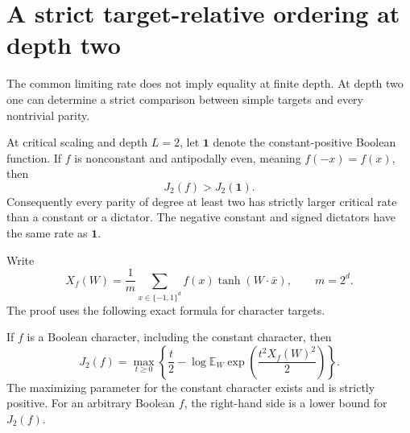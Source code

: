\section{A strict target-relative ordering at depth two}
\label{sec:critical-shallow-ordering}

The common limiting rate does not imply equality at finite depth.
At depth two one can determine a strict comparison between simple
targets and every nontrivial parity.

\begin{theorem}
\label{thm:critical-shallow-parity-ordering}
At critical scaling and depth $L=2$, let $\mathbf1$ denote the
constant-positive Boolean function. If $f$ is nonconstant and
antipodally even, meaning $f(-x)=f(x)$, then
\[
 J_2(f)>J_2(\mathbf1).
\]
Consequently every parity of degree at least two has strictly larger
critical rate than a constant or a dictator. The negative constant
and signed dictators have the same rate as $\mathbf1$.
\end{theorem}

Write
\[
 X_f(W)=\frac1m\sum_{x\in\{-1,1\}^d}
                 f(x)\tanh(W\cdot\bar x),\qquad m=2^d.
\]
The proof uses the following exact formula for character targets.

\begin{lemma}
\label{lem:critical-character-cramer}
If $f$ is a Boolean character, including the constant character, then
\[
 J_2(f)=\max_{t\ge0}\left\{
 \frac t2-\log\mathbb E_W
                 \exp\left(\frac{t^2X_f(W)^2}{2}\right)\right\}.
\]
The maximizing parameter for the constant character exists and is
strictly positive. For an arbitrary Boolean $f$, the right-hand side
is a lower bound for $J_2(f)$.
\end{lemma}

